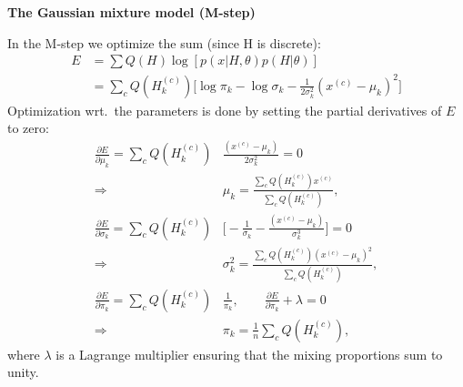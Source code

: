 \documentclass{slides}
\newcommand{\heading}[1]{\begin{center}\large\bf #1\end{center}}
\begin{document}
\begin{slide}
\heading{The Gaussian mixture model (M-step)}

In the M-step we optimize the sum (since H is discrete):
\[
\begin{split}
E&= \sum Q(H)\log[p(x|H,\theta)p(H|\theta)]\\
&=\sum_c Q(H^{(c)}_k)\big[\log\pi_k-\log\sigma_k-\frac{1}{2\sigma_k^2}(x^{(c)}-\mu_k)^2\big] 
\end{split}
\]
Optimization wrt.~the parameters is done by setting the partial derivatives of $E$ to zero:
\[
\begin{split}
\frac{\partial E}{\partial \mu_k}=\sum_cQ(H_k^{(c)})&\frac{(x^{(c)}-\mu_k)}{2\sigma_k^2} = 0\\
\Rightarrow & \mu_k = \frac{\sum_cQ(H^{(c)}_k)x^{(c)}}{\sum_c Q(H_k^{(c)})},\\
\frac{\partial E}{\partial \sigma_k}=\sum_cQ(H_k^{(c)})&\big[-\frac{1}{\sigma_k}-\frac{(x^{(c)}-\mu_k)}{\sigma_k^3}\big] = 0\\
\Rightarrow & \sigma_k^2 = \frac{\sum_cQ(H^{(c)}_k)(x^{(c)}-\mu_k)^2}{\sum_c Q(H_k^{(c)})},\\
\frac{\partial E}{\partial\pi_k} = \sum_cQ(H_k^{(c)})&\frac{1}{\pi_k},\qquad \frac{\partial E}{\partial\pi_k}+\lambda=0\\
\Rightarrow & \pi_k=\frac{1}{n}\sum_cQ(H_k^{(c)}),
\end{split}
\]
where $\lambda$ is a Lagrange multiplier ensuring that the mixing
proportions sum to unity.
\end{slide}
\end{document}
